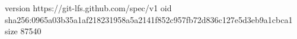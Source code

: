 version https://git-lfs.github.com/spec/v1
oid sha256:0965a03b35a1af218231958a5a2141f852c957fb72d836c127e5d3eb9a1cbca1
size 87540
